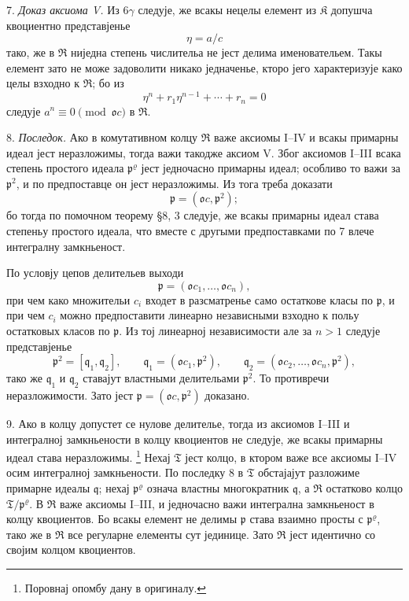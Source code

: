 \documentclass[11pt]{article}
\providecommand{\mR}{\mathfrak{R}}
\providecommand{\mK}{\mathfrak{K}}
\providecommand{\mT}{\mathfrak{T}}
\providecommand{\mo}{\mathfrak{o}}
\providecommand{\mq}{\mathfrak{q}}
\providecommand{\mpideal}{\mathfrak{p}}
\begin{document}
7. \emph{Доказ аксиома V.} Из 6$\gamma$ следује, же всакы нецелы елемент из $\mK$ допушча квоциентно представјенье
\[
        \eta=a/c
\]
тако, же в $\mR$ ниједна степень числительа не јест делима именовательем. Такы елемент зато не може задоволити никако једначенье, кторо јего характеризује како целы взходно к $\mR$; бо из
\[
        \eta^n+r_1\eta^{n-1}+\cdots+r_n=0
\]
следује $a^n\equiv0\pmod{\mo c}$ в $\mR$.

8. \emph{Последок.} Ако в комутативном колцу $\mR$ важе аксиомы I--IV и всакы примарны идеал јест неразложимы, тогда важи такодже аксиом V. Због аксиомов I--III всака степень простого идеала $\mpideal^\varrho$ јест једночасно примарны идеал; особливо то важи за $\mpideal^2$, и по предпоставце он јест неразложимы. Из тога треба доказати
\[
        \mpideal=(\mo c,\mpideal^2);
\]
бо тогда по помочном теорему §8, 3 следује, же всакы примарны идеал става степеньу простого идеала, что вместе с другыми предпоставками по 7 влече интегралну замкньеност.

По условју цепов делительев выходи
\[
        \mpideal=(\mo c_1,\ldots,\mo c_n),
\]
при чем како множительи $c_i$ входет в разсматренье само остаткове класы по $\mpideal$, и при чем $c_i$ можно предпоставити линеарно независными взходно к польу остатковых класов по $\mpideal$. Из тој линеарној независимости але за $n>1$ следује представјенье
\[
        \mpideal^2=[\mq_1,\mq_2],
        \qquad \mq_1=(\mo c_1,\mpideal^2),
        \qquad \mq_2=(\mo c_2,\ldots,\mo c_n,\mpideal^2),
\]
тако же $\mq_1$ и $\mq_2$ ставајут властными делительами $\mpideal^2$. То противречи неразложимости. Зато јест $\mpideal=(\mo c,\mpideal^2)$ доказано.

9. Ако в колцу допустет се нулове делителье, тогда из аксиомов I--III и интегралној замкньености в колцу квоциентов не следује, же всакы примарны идеал става неразложимы.
\footnote{Поровнај опомбу дану в оригиналу.}
Нехај $\mT$ јест колцо, в ктором важе все аксиомы I--IV осим интегралној замкньености. По последку 8 в $\mT$ обстајајут разложиме примарне идеалы $\mq$; нехај $\mpideal^\varrho$ означа властны многократник $\mq$, а $\mR$ остатково колцо $\mT/\mpideal^\varrho$. В $\mR$ важе аксиомы I--III, и једночасно важи интегрална замкньеност в колцу квоциентов. Бо всакы елемент не делимы $\mpideal$ става взаимно просты с $\mpideal^\varrho$, тако же в $\mR$ все регуларне елементы сут јединице. Зато $\mR$ јест идентично со својим колцом квоциентов.
\end{document}
